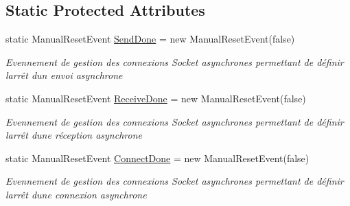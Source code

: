 \subsection*{Static Protected Attributes}
\begin{DoxyCompactItemize}
\item 
static Manual\+Reset\+Event \hyperlink{class_node_net_1_1_network_1_1_nodes_1_1_node_a5995108151b216b553cf5810f64dc5f2}{Send\+Done} = new Manual\+Reset\+Event(false)
\begin{DoxyCompactList}\small\item\em Evennement de gestion des connexions Socket asynchrones permettant de définir l\textquotesingle{}arrêt d\textquotesingle{}un envoi asynchrone \end{DoxyCompactList}\item 
static Manual\+Reset\+Event \hyperlink{class_node_net_1_1_network_1_1_nodes_1_1_node_a0d1ad8b0224cc196cb71ae364ba6866e}{Receive\+Done} = new Manual\+Reset\+Event(false)
\begin{DoxyCompactList}\small\item\em Evennement de gestion des connexions Socket asynchrones permettant de définir l\textquotesingle{}arrêt d\textquotesingle{}une réception asynchrone \end{DoxyCompactList}\item 
static Manual\+Reset\+Event \hyperlink{class_node_net_1_1_network_1_1_nodes_1_1_node_acff9587256712b84d7b8f7173b346550}{Connect\+Done} = new Manual\+Reset\+Event(false)
\begin{DoxyCompactList}\small\item\em Evennement de gestion des connexions Socket asynchrones permettant de définir l\textquotesingle{}arrêt d\textquotesingle{}une connexion asynchrone \end{DoxyCompactList}\end{DoxyCompactItemize}
